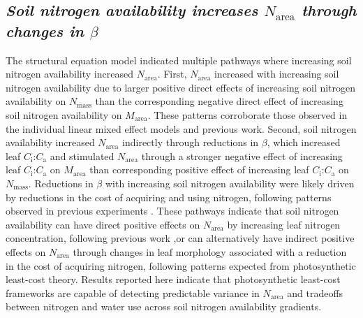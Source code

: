 \subsection{\textit{Soil nitrogen availability increases $N_\mathrm{area}$ through changes in $\beta$}}
\noindent The structural equation model indicated multiple pathways where increasing soil nitrogen availability increased $N_\mathrm{area}$. First, $N_\mathrm{area}$ increased with increasing soil nitrogen availability due to larger positive direct effects of increasing soil nitrogen availability on $N_\mathrm{mass}$ than the corresponding negative direct effect of increasing soil nitrogen availability on $M_\mathrm{area}$. These patterns corroborate those observed in the individual linear mixed effect models and previous work. Second, soil nitrogen availability increased $N_\mathrm{area}$ indirectly through reductions in $\beta$, which increased leaf $C_\mathrm{i}$:$C_\mathrm{a}$ and stimulated $N_\mathrm{area}$ through a stronger negative effect of increasing leaf $C_\mathrm{i}$:$C_\mathrm{a}$ on $M_\mathrm{area}$ than corresponding positive effect of increasing leaf $C_\mathrm{i}$:$C_\mathrm{a}$ on $N_\mathrm{mass}$. Reductions in $\beta$ with increasing soil nitrogen availability were likely driven by reductions in the cost of acquiring and using nitrogen, following patterns observed in previous experiments . These pathways indicate that soil nitrogen availability can have direct positive effects on $N_\mathrm{area}$ by increasing leaf nitrogen concentration, following previous work ,or can alternatively have indirect positive effects on $N_\mathrm{area}$ through changes in leaf morphology associated with a reduction in the cost of acquiring nitrogen, following patterns expected from photosynthetic least-cost theory. Results reported here indicate that photosynthetic least-cost frameworks are capable of detecting predictable variance in $N_\mathrm{area}$ and tradeoffs between nitrogen and water use across soil nitrogen availability gradients.

\bigskip
